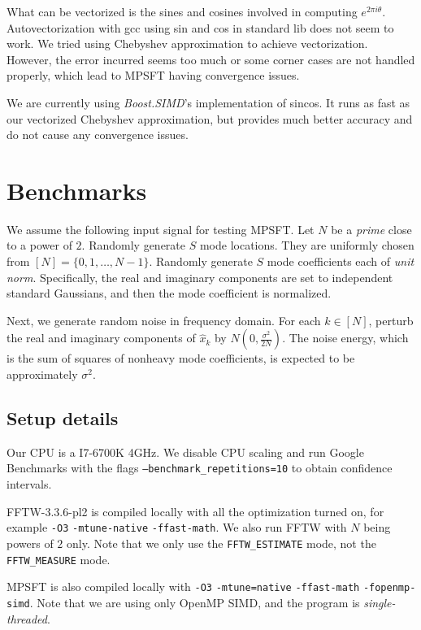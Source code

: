 \documentclass[10pt]{article}
\begin{document}
What can be vectorized is the sines and cosines involved in computing $e^{2\pi i \theta}$. Autovectorization with gcc using sin and cos in standard lib does not seem to work. We tried using Chebyshev approximation to achieve vectorization. However, the error incurred seems too much or some corner cases are not handled properly, which lead to MPSFT having convergence issues.

We are currently using \emph{Boost.SIMD}'s \cite{Esterie:2014:BGP:2568058.2568063} implementation of sincos. It runs as fast as our vectorized Chebyshev approximation, but provides much better accuracy and do not cause any convergence issues.

\section{Benchmarks}

We assume the following input signal for testing MPSFT. Let $N$ be a \emph{prime} close to a power of $2$. Randomly generate $S$ mode locations. They are uniformly chosen from $[N]=\{0,1,\ldots,N-1\}$. Randomly generate $S$ mode coefficients each of \emph{unit norm}. Specifically, the real and imaginary components are set to independent standard Gaussians, and then the mode coefficient is normalized.

Next, we generate random noise in frequency domain. For each $k\in [N]$, perturb the real and imaginary components of $\hat{x}_k$ by $N(0, \frac{\sigma^2}{2N})$. The noise energy, which is the sum of squares of nonheavy mode coefficients, is expected to be approximately $\sigma^2$.

\subsection{Setup details}
Our CPU is a I7-6700K 4GHz. We disable CPU scaling and run Google Benchmarks with the flags \texttt{--benchmark\_repetitions=10} to obtain confidence intervals.

FFTW-3.3.6-pl2 is compiled locally with all the optimization turned on, for example \texttt{-O3} \texttt{-mtune-native} \texttt{-ffast-math}. We also run FFTW with $N$ being powers of $2$ only. Note that we only use the \texttt{FFTW\_ESTIMATE} mode, not the \texttt{FFTW\_MEASURE} mode.

MPSFT is also compiled locally with \texttt{-O3} \texttt{-mtune=native} \texttt{-ffast-math} \texttt{-fopenmp-simd}. Note that we are using only OpenMP SIMD, and the program is \emph{single-threaded}.
\end{document}
